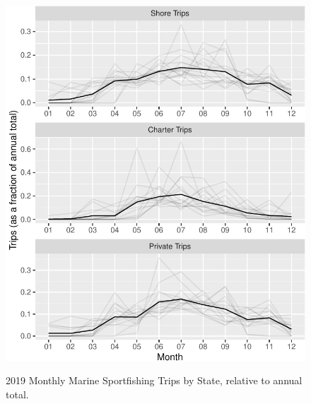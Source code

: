 \documentclass[12pt]{article}
\begin{document}
\begin{figure}

{\centering \includegraphics{C19PolicyRec_files/figure-latex/trips-seasonality-plot-1} 
}
\caption{2019 Monthly Marine Sportfishing Trips by State, relative to annual total. }\label{fig:trips-seasonality-plot}
\end{figure}
\end{document}
